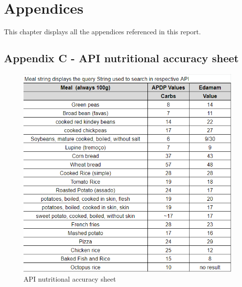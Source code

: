 %
%

\chapter{Appendices}

This chapter displays all the appendices referenced in this report.

\newpage

\appendix


\appendix


\appendix
\section*{Appendix C - API nutritional accuracy sheet}
\label{app:nutritional_sheet}
\begin{figure}[H] 
    \begin{center}
        \includegraphics[scale=1]{_figures/api_nutritional_accuracy.png}
        \caption{API nutritional accuracy sheet}
    \end{center}       
\end{figure}
